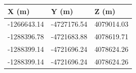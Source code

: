 \begin{tabular}{lll}
X (m) & Y (m) & Z (m) \\ 
\hline 
-1266643.14 & -4727176.54 & 4079014.03 \\ 
-1288396.78 & -4721683.88 & 4078619.71 \\ 
-1288399.14 & -4721696.24 & 4078624.26 \\ 
-1288399.14 & -4721696.24 & 4078624.26 \\ 
\hline 
\end{tabular}